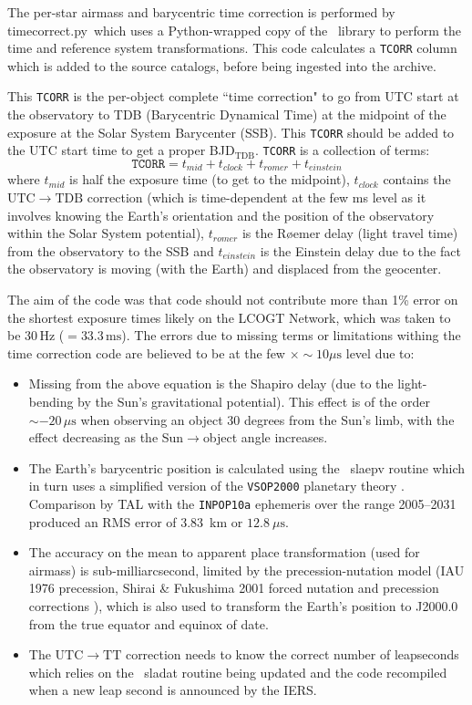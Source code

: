 \documentclass[twoside,11pt]{article}
\newcommand{\xref}[3]{#1}
\renewcommand{\_}{\texttt{\symbol{95}}}
\newcommand{\SLALIB}{\xref{{\sc{SLALIB}}}{sun67}{}}
\newcommand{\task}[1]{\textsf{#1}}
\newcommand{\ndfcomp}[1]{\texttt{#1}}    %
\newcommand{\LCONet}{LCOGT Network}
\newcommand{\rmn}[1] {\mathrm{#1}}
\begin{document}
The per-star airmass and barycentric time correction is performed by
\task{timecorrect.py}\ which uses a Python-wrapped copy of the \SLALIB\ library
to perform the time and reference system transformations. This code calculates a
\ndfcomp{TCORR} column which is added to the source catalogs, before being
ingested into the archive. 

This \ndfcomp{TCORR} is the per-object complete ``time correction" to go from UTC start at the
observatory to TDB (Barycentric Dynamical Time) at the midpoint of the exposure
at the Solar System Barycenter (SSB). This \ndfcomp{TCORR} should be added to the UTC
start time to get a proper BJD$_\rmn{TDB}$. \ndfcomp{TCORR} is a collection of terms:
\begin{equation}
\texttt{TCORR} = t_{mid}+t_{clock}+t_{romer}+t_{einstein}
\end{equation}
where $t_{mid}$ is half the exposure time (to get to the midpoint), $t_{clock}$
contains the $\rmn{UTC}\rightarrow\rmn{TDB}$ correction (which is time-dependent at the few ms level as
it involves knowing the Earth's orientation and the position of the observatory
within the Solar System potential), $t_{romer}$ is the R\o emer delay (light travel
time) from the observatory to the SSB and $t_{einstein}$ is the Einstein delay due
to the fact the observatory is moving (with the Earth) and displaced from the geocenter.

The aim of the code was that code should not contribute more than 1\% error on
the shortest exposure times likely on the \LCONet, which was taken to be 30\,Hz
($=33.3\,\rmn{ms}$). The errors due to missing terms or limitations withing the
time correction code are believed to be at the few $\times\sim10\mu\rmn{s}$
level due to:
\begin{itemize}
\item Missing from the above equation is the Shapiro delay (due to the light-bending
by the Sun's gravitational potential). This effect is of the order $\sim-20\,\mu\rmn{s}$
when observing an object 30 degrees from the Sun's limb, with the effect decreasing as the
Sun$\rightarrow$object angle increases.
\item The Earth's barycentric position is calculated using the \SLALIB\
\task{sla\_epv} routine which in turn uses a simplified version of the
\texttt{VSOP2000} planetary theory \cite{vsop2000}. Comparison by TAL with the
\texttt{INPOP10a} ephemeris \cite{inpop10a} over the range 2005--2031 produced
an RMS error of 3.83\ km or $12.8\ \mu\rmn{s}$.
\item The accuracy on the mean to apparent place transformation (used for
airmass) is sub-milliarcsecond, limited by the precession-nutation model (IAU
1976 precession, Shirai \& Fukushima 2001 forced nutation and precession
corrections \cite{sf2001}), which is also used to transform the Earth's position to
J2000.0 from the true equator and equinox of date.
\item The $\rmn{UTC}\rightarrow\rmn{TT}$ correction needs to know the correct
number of leapseconds which relies on the \SLALIB\ \task{sla\_dat} routine being
updated and the code recompiled when a new leap second is announced by the IERS.
\end{itemize}
\end{document}
